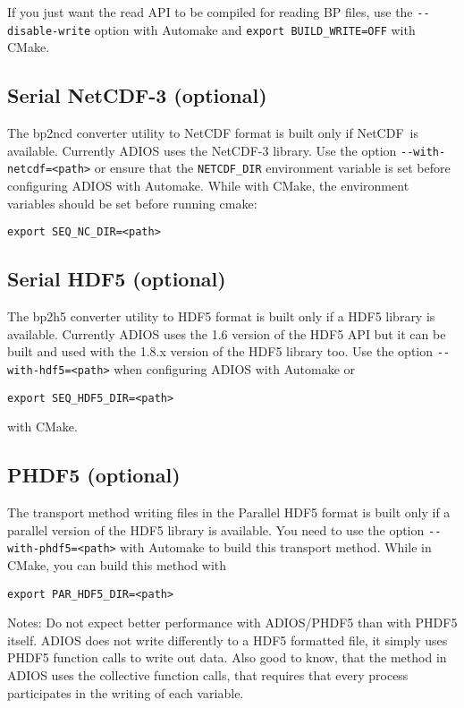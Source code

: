 If you just want the read API to be compiled for reading BP files, use the \verb+--disable-write+ option with Automake and \verb+export BUILD_WRITE=OFF+ with CMake.


\subsection{Serial NetCDF-3 (optional)}

The bp2ncd converter utility to NetCDF format is built only if NetCDF~is available.
 Currently ADIOS uses the NetCDF-3 library. Use the option \verb+--with-netcdf=<path>+
or ensure that the \verb+NETCDF_DIR+ environment variable is set before configuring ADIOS with Automake.
While with CMake, the environment variables should be set before running cmake:
\begin{lstlisting}
export SEQ_NC_DIR=<path>
\end{lstlisting}

\subsection{Serial HDF5 (optional)}

The bp2h5 converter utility to HDF5 format is built only if a HDF5 library is available.
Currently ADIOS uses the 1.6 version of the HDF5 API but it can be built and used
with the 1.8.x version of the HDF5 library too. Use the option \verb+--with-hdf5=<path>+
when configuring ADIOS with Automake or
\begin{lstlisting}
export SEQ_HDF5_DIR=<path>
\end{lstlisting}
\noindent with CMake.


\subsection{PHDF5 (optional)}

The transport method writing files in the Parallel HDF5 format is built only if
a parallel version of the HDF5 library is available. You need to use the
option \verb+--with-phdf5=<path>+ with Automake to build this transport method.
While in CMake, you can build this method with
\begin{lstlisting}
export PAR_HDF5_DIR=<path>
\end{lstlisting}

\noindent Notes: Do not expect better performance with ADIOS/PHDF5 than with PHDF5 itself. ADIOS does not write differently to a HDF5 formatted file, it simply uses PHDF5 function calls to write out data. Also good to know, that the method in ADIOS uses the collective function calls, that requires that every process participates in the writing of each variable.

